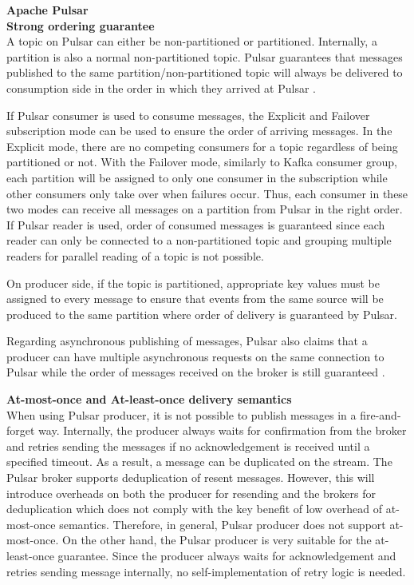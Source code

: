 \large \textbf{Apache Pulsar}\\
\normalsize
\textbf{Strong ordering guarantee}\\
A topic on Pulsar can either be non-partitioned or partitioned. Internally, a partition is also a normal non-partitioned topic. Pulsar guarantees that messages published to the same partition/non-partitioned topic will always be delivered to consumption side in the order in which they arrived at Pulsar \cite{pulsarguarantee}.

If Pulsar consumer is used to consume messages, the Explicit and Failover subscription mode can be used to ensure the order of arriving messages. In the Explicit mode, there are no competing consumers for a topic regardless of being partitioned or not. With the Failover mode, similarly to Kafka consumer group, each partition will be assigned to only one consumer in the subscription while other consumers only take over when failures occur. Thus, each consumer in these two modes can receive all messages on a partition from Pulsar in the right order. If Pulsar reader is used, order of consumed messages is guaranteed since each reader can only be connected to a non-partitioned topic and grouping multiple readers for parallel reading of a topic is not possible. 

On producer side, if the topic is partitioned, appropriate key values must be assigned to every message to ensure that events from the same source will be produced to the same partition where order of delivery is guaranteed by Pulsar.

Regarding asynchronous publishing of messages, Pulsar also claims that a producer can have multiple asynchronous requests on the same connection to Pulsar while the order of messages received on the broker is still guaranteed \cite{pulsarinflight}.

\textbf{At-most-once and At-least-once delivery semantics}\\
When using Pulsar producer, it is not possible to publish messages in a fire-and-forget way. Internally, the producer always waits for confirmation from the broker and retries sending the messages if no acknowledgement is received until a specified timeout. As a result, a message can be duplicated on the stream. The Pulsar broker supports deduplication of resent messages. However, this will introduce overheads on both the producer for resending and the brokers for deduplication which does not comply with the key benefit of low overhead of at-most-once semantics. Therefore, in general, Pulsar producer does not support at-most-once. On the other hand, the Pulsar producer is very suitable for the at-least-once guarantee. Since the producer always waits for acknowledgement and retries sending message internally, no self-implementation of retry logic is needed.  

